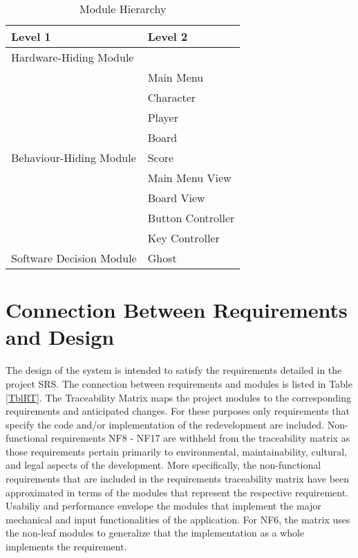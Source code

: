 \documentclass[12pt, titlepage]{article}
\begin{document}
\begin{table}[h!]
\centering
\begin{tabular}{p{} p{}}
\toprule
\textbf{Level 1} & \textbf{Level 2}\\
\midrule

{Hardware-Hiding Module} & ~ \\
\midrule

\multirow{9}{0.3\textwidth}{Behaviour-Hiding Module}
& Main Menu\\
& Character\\
& Player\\
& Board\\
& Score\\
& Main Menu View\\ 
& Board View\\
& Button Controller\\
& Key Controller\\
\midrule

{Software Decision Module} & Ghost\\
\bottomrule

\end{tabular}
\caption{Module Hierarchy}
\label{TblMH}
\end{table}

\section{Connection Between Requirements and Design} \label{SecConnection}

The design of the system is intended to satisfy the requirements detailed in the project SRS. The connection
between requirements and modules is listed in Table \ref{TblRT}. The Traceability Matrix maps the project modules to the corresponding requirements and anticipated changes. For these purposes only requirements that specify the code and/or implementation of the redevelopment are included. Non-functional requirements NF8 - NF17 are withheld from the traceability matrix as those requirements pertain primarily to environmental, maintainability, cultural, and legal aspects of the development. More specifically, the non-functional requirements that are included in the requirements traceability matrix have been approximated in terms of the modules that represent the respective requirement. Usabiliy and performance envelope the modules that implement the major mechanical and input functionalities of the application. For NF6, the matrix uses the non-leaf modules to generalize that the implementation as a whole implements the requirement.
\end{document}
